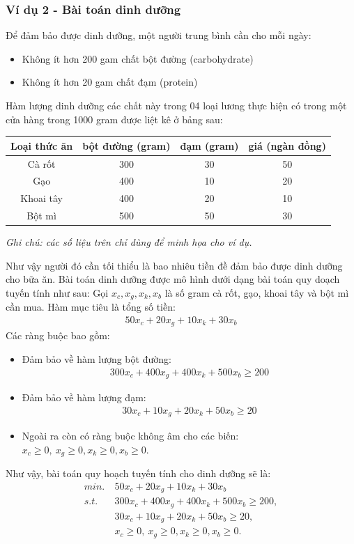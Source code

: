 \documentclass{book}
\begin{document}
\subsubsection{Ví dụ 2 - Bài toán dinh dưỡng}
Để đảm bảo được dinh dưỡng, một người trung bình cần cho mỗi ngày:
\begin{itemize}
\item	Không ít hơn 200 gam chất bột đường (carbohydrate)
\item	Không ít hơn 20 gam chất đạm (protein)
\end{itemize}
Hàm lượng dinh dưỡng các chất này trong 04 loại lương thực hiện có trong một cửa hàng trong 1000 gram được liệt kê ở bảng sau:\\
\begin{tabular}{|c|c|c|c|}
\hline
Loại thức ăn	& bột đường	(gram) &đạm (gram)	&giá (ngàn đồng)\\
\hline
Cà rốt	&300	&30	&50\\
\hline
Gạo		&400	&10	&20\\
\hline
Khoai tây	&400	&20	&10\\
\hline
Bột mì	&500	&50	&30\\
\hline
\end{tabular}

\textit{Ghi chú: các số liệu trên chỉ dùng để minh họa cho ví dụ.}

Như vậy người đó cần tối thiểu là bao nhiêu tiền đề đảm bảo được dinh dưỡng cho bữa ăn.
Bài toán dinh dưỡng được mô hình dưới dạng bài toán quy doạch tuyến tính như sau:
Gọi $x_c, x_g, x_k, x_b$ là số gram cà rốt, gạo, khoai tây và bột mì cần mua. 
Hàm mục tiêu là tổng số tiền:
\begin{align}
50x_c+20x_g+10x_k+30x_b
\end{align}
Các ràng buộc bao gồm:
\begin{itemize}
\item Đảm bảo về hàm lượng bột đường:
\begin{align}
300x_c+400x_g+400x_k+500x_b \geq 200
\end{align}
\item Đảm bảo về hàm lượng đạm:
\begin{align}
30x_c+10x_g+20x_k+50x_b\geq20
\end{align}

\item Ngoài ra còn có ràng buộc không âm cho các biến:
$x_c\geq0,\ x_g \geq 0,x_k \geq 0,x_b\geq0$.
\end{itemize}

Như vậy, bài toán quy hoạch tuyến tính cho dinh dưỡng sẽ là:
\begin{align}
min.~& 50x_c+20x_g+10x_k+30x_b \\
s.t.~ & 300x_c+400x_g+400x_k+500x_b\geq200,\\
	&	30x_c+10x_g+20x_k+50x_b\geq20,\\ 
	&	x_c\geq0,\ x_g\geq0,x_k\geq0,x_b\geq0.		
\end{align}
\end{document}
